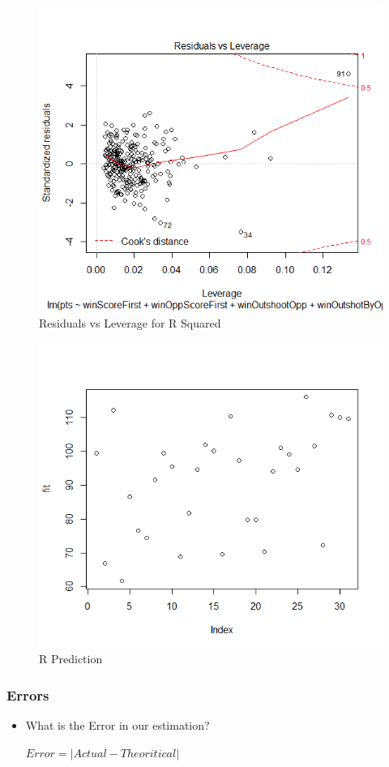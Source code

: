 \documentclass{beamer}
\begin{document}
\begin{frame}
	\begin{figure}
		\centering
		\includegraphics[width=0.7\linewidth]{R4}
		\caption{Residuals vs Leverage for R Squared}
		\label{fig:Residuals vs Leverage for R Squared}
	\end{figure}
\end{frame}
\begin{frame}
	\begin{figure}
		\centering
		\includegraphics[width=0.7\linewidth]{"R Prediction"}
		\caption{R Prediction}
		\label{fig:R Prediction}
	\end{figure}	
\end{frame}
\begin{frame}
\frametitle{Errors}
	\begin{itemize}
		\item What is the Error in our estimation?
		\begin{center}
			$Error = |Actual - Theoritical|$
		\end{center}
	\end{itemize}
\end{frame}
\end{document}
